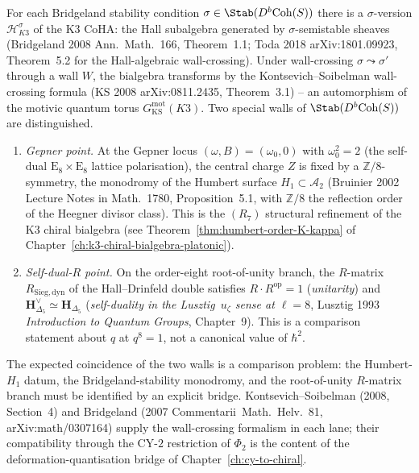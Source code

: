 \begin{remark}
\label{rem:cwc-k3-bridgeland-wall}
For each Bridgeland stability condition $\sigma\in\Stab(D^b\mathrm{Coh}(S))$
there is a $\sigma$-version
$\mathcal{H}_{K3}^\sigma$ of the K3 CoHA: the Hall subalgebra generated by
$\sigma$-semistable sheaves (Bridgeland 2008
\textup{Ann.~Math.}~166, Theorem~1.1; Toda 2018 \textup{arXiv:1801.09923},
Theorem~5.2 for the Hall-algebraic wall-crossing). Under wall-crossing
$\sigma\leadsto\sigma'$ through a wall $W$, the bialgebra transforms by
the Kontsevich--Soibelman wall-crossing formula (KS 2008
\textup{arXiv:0811.2435}, Theorem~3.1) -- an automorphism of the
motivic quantum torus
$G^{\mathrm{mot}}_{\mathrm{KS}}(K3)$. Two special walls of
$\Stab(D^b\mathrm{Coh}(S))$ are distinguished.
\begin{enumerate}[label=\textup{(\alph*)}]
 \item \emph{Gepner point.} At the Gepner locus
 $(\omega, B) = (\omega_0, 0)$ with $\omega_0^2 = 2$ (the self-dual
 $\mathrm{E}_8\times\mathrm{E}_8$ lattice polarisation), the central
 charge $Z$ is fixed by a $\mathbb{Z}/8$-symmetry, the monodromy of
 the Humbert surface $H_1 \subset \mathcal{A}_2$ (Bruinier 2002
 \textup{Lecture Notes in Math.}~1780, Proposition~5.1, with
 $\mathbb{Z}/8$ the reflection order of the Heegner divisor class).
 This is the $(R_7)$ structural refinement of the K3 chiral
 bialgebra (see Theorem~\ref{thm:humbert-order-K-kappa} of
 Chapter~\ref{ch:k3-chiral-bialgebra-platonic}).
 \item \emph{Self-dual-\(R\) point.} On the order-eight root-of-unity
 branch, the \(R\)-matrix \(R_{\mathrm{Sieg,dyn}}\) of the
 Hall--Drinfeld double satisfies $R\cdot R^{\mathrm{op}} = 1$
 (\emph{unitarity}) and $\mathbf{H}_{\Delta_5}^\vee \simeq \mathbf{H}_{\Delta_5}$
 (\emph{self-duality in the Lusztig~$u_\zeta$ sense at $\ell=8$},
 Lusztig 1993 \emph{Introduction to Quantum Groups}, Chapter~9).
 This is a comparison statement about \(q\) at \(q^8=1\), not a
 canonical value of \(\hbar^2\).
\end{enumerate}
The expected coincidence of the two walls is a comparison problem:
the Humbert-\(H_1\) datum, the Bridgeland-stability monodromy, and the
root-of-unity \(R\)-matrix branch must be identified by an explicit
bridge. Kontsevich--Soibelman
(2008, Section~4) and Bridgeland (2007 \textup{Commentarii~Math.~Helv.}~81,
\textup{arXiv:math/0307164}) supply the wall-crossing formalism in each
lane; their compatibility through the CY-$2$ restriction of
$\Phi_2$ is the content of the deformation-quantisation bridge
of Chapter~\ref{ch:cy-to-chiral}.
\end{remark}

